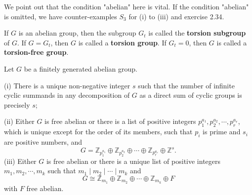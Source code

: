 We point out that the condition "abelian" here is vital. If the condition "abelian" is omitted, we have counter-examples $S_3$ for (i) to (iii) and exercise 2.34.\par
If $G$ is an abelian group, then the subgroup $G_t$ is called the \textbf{torsion subgroup} of $G$. If $G=G_t$, then $G$ is called a \textbf{torsion group}. If $G_t=0$, then $G$ is called a \textbf{torsion-free group}.
\begin{theorem}
Let $G$ be a finitely generated abelian group.\par
(i) There is a unique non-negative integer $s$ such that the number of infinite cyclic summands in any decomposition of $G$ as a direct sum of cyclic groups is precisely $s$;\par
(ii) Either $G$ is free abelian or there is a list of positive integers $p_1^{a_1},p_2^{a_2},\cdots,p_r^{a_r}$, which is unique except for the order of its members, such that $p_i$ is prime and $s_i$ are positive numbers, and 
$$
G=\mathbb{Z} _{p_{1}^{a_1}}\oplus \mathbb{Z} _{p_{2}^{a_2}}\oplus \cdots \oplus \mathbb{Z} _{p_{r}^{a_r}}\oplus \mathbb{Z} ^s.
$$
(iii) Either $G$ is free abelian or there is a unique list of positive integers $m_1,m_2,\cdots,m_k$ such that $m_1\mid m_2\mid\cdots\mid m_k$ and 
$$
G\cong \mathbb{Z} _{m_1}\oplus \mathbb{Z} _{m_2}\oplus \cdots \oplus \mathbb{Z} _{m_k}\oplus F
$$
with $F$ free abelian.
\end{theorem}
